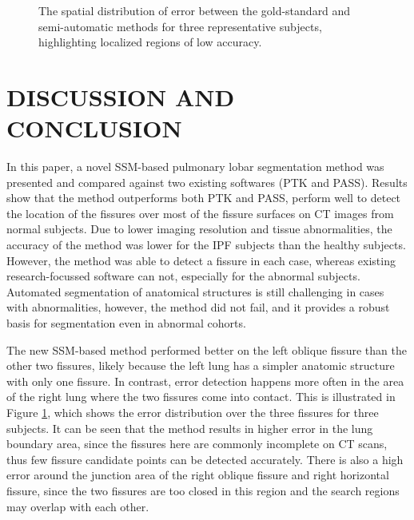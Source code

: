 \documentclass[]{spie}  %
\begin{document}
{\begin{figure}[htbp]
\begin{subfigure}
{\begin{minipage}[t]{0.26\linewidth}
  \centerline{}
	\end{minipage}%
   }%
  \label{fig:QuanlititativeResult-c} 
\end{subfigure}
\caption{The spatial distribution of error between the gold-standard and semi-automatic methods for three representative subjects, highlighting localized regions of low accuracy.}
\label{fig:QuanlititativeResult}
\end{figure}


\section{DISCUSSION AND CONCLUSION}
In this paper, a novel SSM-based pulmonary lobar segmentation method was presented and compared against two existing softwares (PTK and PASS). Results show that the method outperforms both PTK and PASS, perform well to detect the location of the fissures over most of the fissure surfaces on CT images from normal subjects. Due to lower imaging resolution and tissue abnormalities, the accuracy of the method was lower for the IPF subjects than the healthy subjects. However, the method was able to detect a fissure in each case, whereas existing research-focussed software can not, especially for the abnormal subjects. Automated segmentation of anatomical structures is still challenging in cases with abnormalities, however, the method did not fail, and it provides a robust basis for segmentation even in abnormal cohorts.

The new SSM-based method performed better on the left oblique fissure than the other two fissures, likely because the left lung has a simpler anatomic structure with only one fissure. In contrast, error detection happens more often in the area of the right lung where the two fissures come into contact. This is illustrated in Figure \ref{fig:QuanlititativeResult}, which shows the error distribution over the three fissures for three subjects. It can be seen that the method results in higher error in the lung boundary area, since the fissures here are commonly incomplete on CT scans, thus few fissure candidate points can be detected accurately. There is also a high error around the junction area of the right oblique fissure and right horizontal fissure, since the two fissures are too closed in this region and the search regions may overlap with each other.

}
\end{document}
